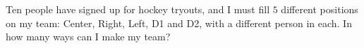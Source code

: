 Ten people have signed up for hockey tryouts, and I must fill $5$ different positions on my team: Center, Right, Left, D1 and D2, with a different person in each. In how many ways can I make my team?
